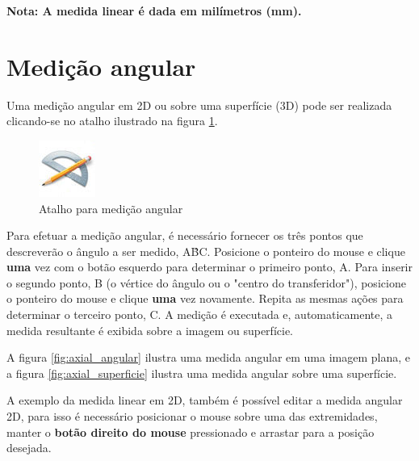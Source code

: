 \textbf{Nota: A medida linear é dada em milímetros (mm).}

\section{Medição angular}

Uma medição angular em 2D ou sobre uma superfície (3D) pode ser realizada clicando-se
no atalho ilustrado na figura \ref{fig:atalho_angular}.

\begin{figure}[!htb]
\centering
\includegraphics[scale=0.2]{../user_guide_figures/icons/measure_angle_original.jpg}
\caption{Atalho para medição angular}
\label{fig:atalho_angular}
\end{figure}

Para efetuar a medição angular, é necessário fornecer os três pontos que descreverão o
ângulo a ser medido, A\^{B}C. Posicione o ponteiro do mouse e clique \textbf{uma} vez
com o botão esquerdo para determinar o primeiro ponto, A. Para inserir o segundo ponto,
B (o vértice do ângulo ou o "centro do transferidor"), posicione o ponteiro do mouse e
clique \textbf{uma} vez novamente. Repita as mesmas ações para determinar o terceiro
ponto, C. A medição é executada e, automaticamente, a medida resultante é exibida sobre
a imagem ou superfície.

A figura \ref{fig:axial_angular} ilustra uma medida angular em uma imagem plana, e a
figura \ref{fig:axial_superficie} ilustra uma medida angular sobre uma superfície.

A exemplo da medida linear em 2D, também é possível editar a medida angular 2D, para isso é necessário posicionar o mouse sobre uma das extremidades, manter o \textbf{botão direito do mouse} pressionado e arrastar para a posição desejada.

